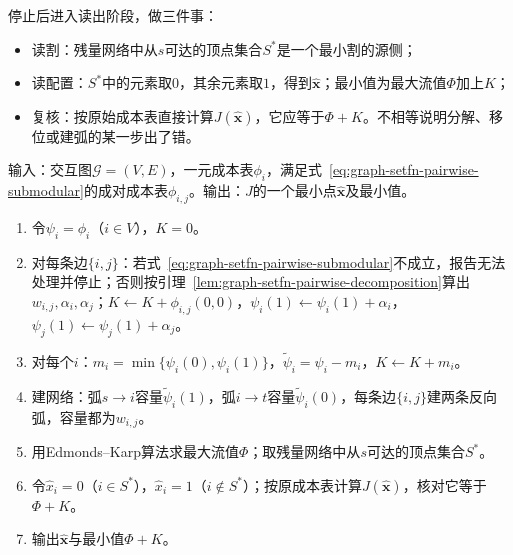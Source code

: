 停止后进入读出阶段，做三件事：
\begin{itemize}
  \item 读割：残量网络中从$s$可达的顶点集合$S^\ast$是一个最小割的源侧；
  \item 读配置：$S^\ast$中的元素取$0$，其余元素取$1$，得到$\hat{\bm x}$；最小值为最大流值$\Phi$加上$K$；
  \item 复核：按原始成本表直接计算$J(\hat{\bm x})$，它应等于$\Phi+K$。不相等说明分解、移位或建弧的某一步出了错。
\end{itemize}

\begin{algorithm}[成对二值函数的图割最小化]
\label{alg:graph-setfn-graph-cut}
输入：交互图$\mathcal G=(V,E)$，一元成本表$\phi_i$，满足式~\eqref{eq:graph-setfn-pairwise-submodular}的成对成本表$\phi_{i,j}$。输出：$J$的一个最小点$\hat{\bm x}$及最小值。
\begin{enumerate}
  \item 令$\psi_i=\phi_i$（$i\in V$），$K=0$。
  \item 对每条边$\{i,j\}$：若式~\eqref{eq:graph-setfn-pairwise-submodular}不成立，报告无法处理并停止；否则按引理~\ref{lem:graph-setfn-pairwise-decomposition}算出$w_{i,j},\alpha_i,\alpha_j$；$K\gets K+\phi_{i,j}(0,0)$，$\psi_i(1)\gets\psi_i(1)+\alpha_i$，$\psi_j(1)\gets\psi_j(1)+\alpha_j$。
  \item 对每个$i$：$m_i=\min\{\psi_i(0),\psi_i(1)\}$，$\tilde\psi_i=\psi_i-m_i$，$K\gets K+m_i$。
  \item 建网络：弧$s\to i$容量$\tilde\psi_i(1)$，弧$i\to t$容量$\tilde\psi_i(0)$，每条边$\{i,j\}$建两条反向弧，容量都为$w_{i,j}$。
  \item 用Edmonds--Karp算法求最大流值$\Phi$；取残量网络中从$s$可达的顶点集合$S^\ast$。
  \item 令$\hat x_i=0$（$i\in S^\ast$），$\hat x_i=1$（$i\notin S^\ast$）；按原成本表计算$J(\hat{\bm x})$，核对它等于$\Phi+K$。
  \item 输出$\hat{\bm x}$与最小值$\Phi+K$。
\end{enumerate}
\end{algorithm}

